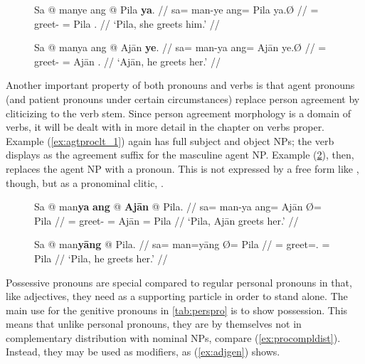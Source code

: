 \begin{figure}
\pex\label{ex:verbinfl2}
\a\begingl
	\gla Sa @ manye ang @ Pila \textbf{ya}. //
	\glb sa= man-ye ang= Pila ya.Ø //
	\glc \PatT{}= greet-\TsgF{} \Aarg{}= Pila \TsgM{}.\Top{} //
	\glft `Pila, she greets him.' //
\endgl

\a\begingl
	\gla Sa @ manya ang @ Ajān \textbf{ye}. //
	\glb sa= man-ya ang= ​Ajān ye.Ø //
	\glc \PatT{}= greet-\TsgM{} \Aarg{}= ​Ajān \TsgF{}.\Top{} //
	\glft `Ajān, he greets her.' //
\endgl
\xe
\end{figure}

Another important property of both pronouns and verbs is that agent pronouns
(and patient pronouns under certain circumstances) replace person agreement by
cliticizing to the verb stem. Since person agreement morphology is a domain of
verbs, it will be dealt with in more detail in the chapter on verbs proper. 
Example (\ref{ex:agtproclt_1}) again has full subject and object NPs; the verb
displays  as the agreement suffix for the masculine agent NP.
Example (\ref{ex:agtproclt_2}), then, replaces the agent NP with a pronoun.
This is not expressed by a free form like , though, but as a pronominal
clitic, .

\begin{figure}[h]
\pex\label{ex:agtproclt}
\a\label{ex:agtproclt_1}%
\begingl
	\gla Sa @ man\textbf{ya} \textbf{ang} @ \textbf{Ajān} {} @ Pila. //
	\glb sa= man-ya ang= ​Ajān Ø= ​Pila //
	\glc \PatT{}= greet-\TsgM{} \Aarg{}= ​Ajān \Top{}= ​Pila //
	\glft `Pila, Ajān greets her.' //
\endgl

\a\label{ex:agtproclt_2}%
\begingl
	\gla Sa @ man\textbf{yāng} {} @ Pila. //
	\glb sa= man=yāng Ø= ​Pila //
	\glc \PatT{}= greet=\TsgM{}.\Aarg{} \Top{}= Pila //
	\glft `Pila, he greets her.' //
\endgl
\xe
\end{figure}


\label{phsec:possadj}
Possessive pronouns are special compared to regular personal pronouns in that,
like adjectives, they need  as a supporting particle in order to
stand alone. The main use for the genitive pronouns in \autoref{tab:perspro} is
to show possession. This means that unlike personal pronouns, they are by
themselves not in complementary distribution with nominal NPs, compare
(\ref{ex:procompldist}). Instead, they may be used as modifiers, as
(\ref{ex:adjgen}) shows.

